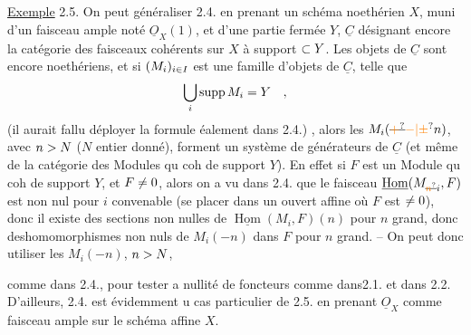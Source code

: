 \uline{Exemple} 2.5. On peut généraliser 2.4. en prenant un schéma 
noethérien $X$, muni d'un faisceau ample noté $\underline O_X(1)$,  et d'une
partie fermée $Y$, $\underline C$ désignant encore la catégorie des faisceaux cohérents
sur $X$ à support $\subset Y$. Les objets de $\underline C$ sont encore noethériens, et si
$(M_i)_{i\in I}$ est une famille d'objets de $\underline C$, telle que 
\[
\bigcup_i\operatorname{supp}M_i=Y\quad,
\]
(il aurait fallu déployer la formule éalement dans 2.4.) , alors les
$M_i(\deleted{\unsure{+}}\unsure{-|\pm}n)$, avec $n>N$ ($N$ entier donné), forment un système de générateurs
de $\underline C$ (et même de la catégorie des Modules qu coh de support $Y$). En effet
si $F$ est un Module qu coh de support $Y$, et $F\ne0$, alors  on a vu
dans 2.4. que le faisceau $\underline{\operatorname{Hom}}(M_{\deleted{\unsure{n}}i},F)$ est non nul pour $i$ convenable (se placer dans un ouvert affine où $F$ est $\ne0$), donc il existe des sections non
nulles de $\underline{\operatorname{Hom}}(M_i,F)(n)$ pour $n$ grand, donc des\handwritten{\unsure{/}}homomorphismes non nuls de
$M_i(-n)$ dans $F$ pour $n$ grand. -- On peut donc utiliser les $M_i(-n)$, $n>N$,

comme dans 2.4., pour tester a nullité de foncteurs comme dans2.1.
et dans 2.2. D'ailleurs, 2.4. est évidemment u cas particulier de 2.5.
en prenant $\underline O_X$ comme faisceau ample sur le schéma affine $X$.

